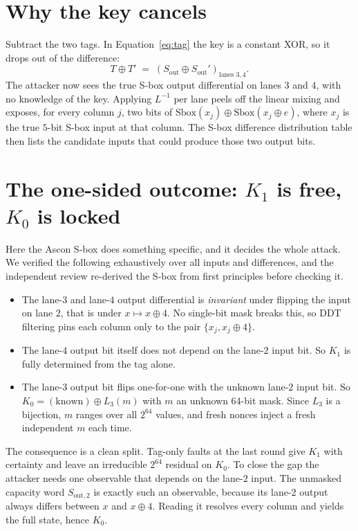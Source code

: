 \documentclass[11pt]{article}
\begin{document}
\section{Why the key cancels}
Subtract the two tags. In Equation~\eqref{eq:tag} the key is a constant XOR, so
it drops out of the difference:
\begin{equation}
T \oplus T' \;=\; (S_{\text{out}} \oplus S_{\text{out}}')_{\text{lanes }3,4}.
\end{equation}
The attacker now sees the true S-box output differential on lanes $3$ and $4$,
with no knowledge of the key. Applying $L^{-1}$ per lane peels off the linear
mixing and exposes, for every column $j$, two bits of
$\mathrm{Sbox}(x_j) \oplus \mathrm{Sbox}(x_j \oplus e)$, where $x_j$ is the true
$5$-bit S-box input at that column. The S-box difference distribution table then
lists the candidate inputs that could produce those two output bits.

\section{The one-sided outcome: $K_1$ is free, $K_0$ is locked}
Here the Ascon S-box does something specific, and it decides the whole attack.
We verified the following exhaustively over all inputs and differences, and the
independent review re-derived the S-box from first principles before checking
it.

\begin{itemize}
\item The lane-$3$ and lane-$4$ output differential is \emph{invariant} under
      flipping the input on lane $2$, that is under $x \mapsto x \oplus 4$.
      No single-bit mask breaks this, so DDT filtering pins each column only to
      the pair $\{x_j, x_j \oplus 4\}$.
\item The lane-$4$ output bit itself does not depend on the lane-$2$ input bit.
      So $K_1$ is fully determined from the tag alone.
\item The lane-$3$ output bit flips one-for-one with the unknown lane-$2$ input
      bit. So $K_0 = (\text{known}) \oplus L_3(m)$ with $m$ an unknown $64$-bit
      mask. Since $L_3$ is a bijection, $m$ ranges over all $2^{64}$ values, and
      fresh nonces inject a fresh independent $m$ each time.
\end{itemize}
The consequence is a clean split. Tag-only faults at the last round give $K_1$
with certainty and leave an irreducible $2^{64}$ residual on $K_0$. To close the
gap the attacker needs one observable that depends on the lane-$2$ input. The
unmasked capacity word $S_{\text{out},2}$ is exactly such an observable, because
its lane-$2$ output always differs between $x$ and $x \oplus 4$. Reading it
resolves every column and yields the full state, hence $K_0$.
\end{document}
